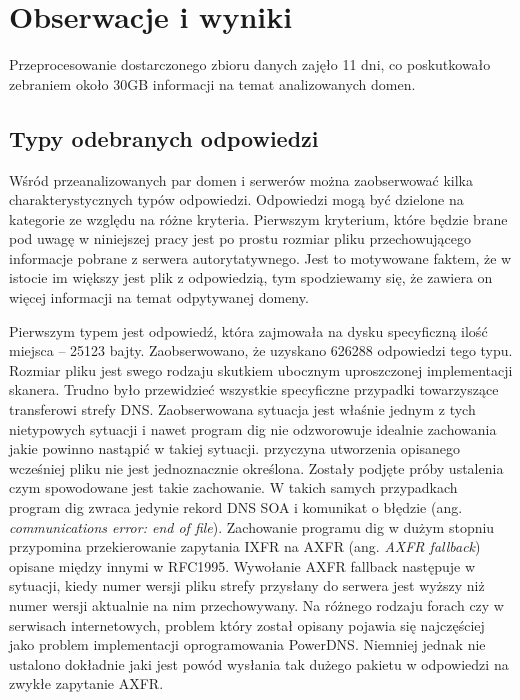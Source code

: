 \chapter{Obserwacje i wyniki}
Przeprocesowanie dostarczonego zbioru danych zajęło 11 dni, co poskutkowało zebraniem około 30GB informacji na temat analizowanych domen.

\section{Typy odebranych odpowiedzi}
Wśród przeanalizowanych par domen i serwerów można zaobserwować kilka charakterystycznych typów odpowiedzi. Odpowiedzi mogą być dzielone na kategorie ze względu na różne kryteria. Pierwszym kryterium, które będzie brane pod uwagę w niniejszej pracy jest po prostu rozmiar pliku przechowującego informacje pobrane z serwera autorytatywnego. Jest to motywowane faktem, że w istocie im większy jest plik z odpowiedzią, tym spodziewamy się, że zawiera on więcej informacji na temat odpytywanej domeny. 

Pierwszym typem jest odpowiedź, która zajmowała na dysku specyficzną ilość miejsca -- 25123 bajty. Zaobserwowano, że uzyskano 626288 odpowiedzi tego typu. Rozmiar pliku jest swego rodzaju skutkiem ubocznym uproszczonej implementacji skanera. Trudno było przewidzieć wszystkie specyficzne przypadki towarzyszące transferowi strefy DNS. Zaobserwowana sytuacja jest właśnie jednym z tych nietypowych sytuacji i nawet program dig nie odzworowuje idealnie zachowania jakie powinno nastąpić w takiej sytuacji. przyczyna utworzenia opisanego wcześniej pliku nie jest jednoznacznie określona. Zostały podjęte próby ustalenia czym spowodowane jest takie zachowanie. W takich samych przypadkach program dig zwraca jedynie rekord DNS SOA i komunikat o błędzie (ang. \textit{communications error: end of file}). Zachowanie programu dig w dużym stopniu przypomina przekierowanie zapytania IXFR na AXFR (ang. \textit{AXFR fallback}) opisane między innymi w RFC1995\cite{RFC1995}. Wywołanie AXFR fallback następuje w sytuacji, kiedy numer wersji pliku strefy przysłany do serwera jest wyższy niż numer wersji aktualnie na nim przechowywany. Na różnego rodzaju forach\cite{powerdns-forum} czy w serwisach internetowych\cite{powerdns-git}, problem który został opisany pojawia się najczęściej jako problem implementacji oprogramowania PowerDNS\cite{powerdns}. Niemniej jednak nie ustalono dokładnie jaki jest powód wysłania tak dużego pakietu w odpowiedzi na zwykłe zapytanie AXFR.

